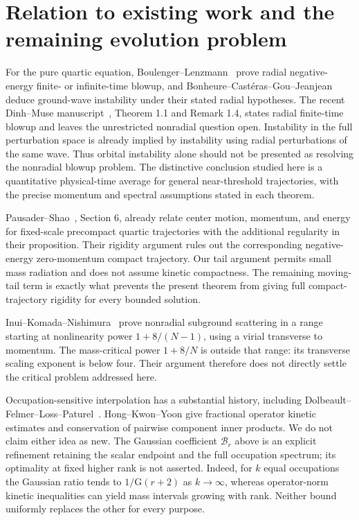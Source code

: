 \documentclass[11pt,a4paper]{article}
\theoremstyle{remark}\newtheorem{remark}[theorem]{Remark}
\begin{document}





\section{Relation to existing work and the remaining evolution problem}
For the pure quartic equation, Boulenger--Lenzmann~\cite{BL} prove
radial negative-energy finite- or infinite-time blowup, and
Bonheure--Cast\'eras--Gou--Jeanjean~\cite{BCGJ} deduce ground-wave
instability under their stated radial hypotheses. The recent
Dinh--Muse manuscript~\cite{DM}, Theorem 1.1 and Remark 1.4, states
radial finite-time blowup and leaves the unrestricted nonradial
question open. Instability in the full perturbation space is already
implied by instability using radial perturbations of the same wave.
Thus orbital instability alone should not be presented as resolving
the nonradial blowup problem. The distinctive conclusion studied here
is a quantitative physical-time average for general near-threshold
trajectories, with the precise momentum and spectral assumptions
stated in each theorem.

Pausader--Shao~\cite{PS}, Section 6, already relate center motion,
momentum, and energy for fixed-scale precompact quartic trajectories
with the additional regularity in their proposition. Their rigidity
argument rules out the corresponding negative-energy zero-momentum
compact trajectory. Our tail argument permits small mass radiation
and does not assume kinetic compactness. The remaining moving-tail
term is exactly what prevents the present theorem from giving full
compact-trajectory rigidity for every bounded solution.

Inui--Komada--Nishimura~\cite{IKN} prove nonradial subground scattering
in a range starting at nonlinearity power $1+8/(N-1)$, using a
virial transverse to momentum. The mass-critical power $1+8/N$ is
outside that range: its transverse scaling exponent is below four.
Their argument therefore does not directly settle the critical
problem addressed here.

Occupation-sensitive interpolation has a substantial history,
including Dolbeault--Felmer--Loss--Paturel~\cite{DFLP}. Hong--Kwon--Yoon
\cite{HKY} give fractional operator kinetic estimates and conservation
of pairwise component inner products. We do not claim either idea as
new. The Gaussian coefficient $\mathcal B_r$ above is an explicit
refinement retaining the scalar endpoint and the full occupation
spectrum; its optimality at fixed higher rank is not asserted.
Indeed, for $k$ equal occupations the Gaussian ratio tends to
$1/\mathrm G(r+2)$ as $k\to\infty$, whereas operator-norm kinetic
inequalities can yield mass intervals growing with rank. Neither
bound uniformly replaces the other for every purpose.
\end{document}
